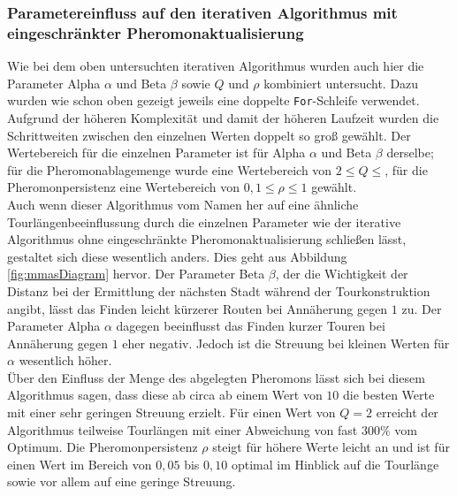 \documentclass[doktyp=barbeit, sprache=german]{TUBAFarbeiten}
\begin{document}
\subsubsection{Parametereinfluss auf den iterativen Algorithmus mit eingeschränkter Pheromonaktualisierung}
Wie bei dem oben untersuchten iterativen Algorithmus wurden auch hier die Parameter Alpha $\alpha$ und Beta $\beta$ sowie $Q$ und $\rho$ kombiniert untersucht. Dazu wurden wie schon oben gezeigt jeweils eine doppelte \texttt{For}-Schleife verwendet. Aufgrund der höheren Komplexität und damit der höheren Laufzeit wurden die Schrittweiten zwischen den einzelnen Werten doppelt so groß gewählt. Der Wertebereich für die einzelnen Parameter ist für Alpha $\alpha$ und Beta $\beta$ derselbe; für die Pheromonablagemenge wurde eine Wertebereich von $2 \leq Q \leq$, für die Pheromonpersistenz eine Wertebereich von $0,1 \leq \rho \leq 1$ gewählt.
\\Auch wenn dieser Algorithmus vom Namen her auf eine ähnliche Tourlängenbeeinflussung durch die einzelnen Parameter wie der iterative Algorithmus ohne eingeschränkte Pheromonaktualisierung schließen lässt, gestaltet sich diese wesentlich anders. Dies geht aus Abbildung \ref{fig:mmasDiagram} hervor. Der Parameter Beta $\beta$, der die Wichtigkeit der Distanz bei der Ermittlung der nächsten Stadt während der Tourkonstruktion angibt, 
lässt das Finden leicht kürzerer Routen bei Annäherung gegen $1$ zu. Der Parameter Alpha $\alpha$ dagegen beeinflusst das Finden kurzer Touren bei Annäherung gegen $1$ eher negativ. Jedoch ist die Streuung bei kleinen Werten für $\alpha$ wesentlich höher. \\Über den Einfluss der Menge des abgelegten Pheromons lässt sich bei diesem Algorithmus sagen, dass diese ab circa ab einem Wert von $10$ die besten Werte mit einer sehr geringen Streuung erzielt. Für einen Wert von $Q = 2$ erreicht der Algorithmus teilweise Tourlängen mit einer Abweichung von fast $300 \%$ vom Optimum. Die Pheromonpersistenz $\rho$ steigt für höhere Werte leicht an und ist für einen Wert im Bereich von $0,05$ bis $0,10$ optimal im Hinblick auf die Tourlänge sowie vor allem auf eine geringe Streuung.
\end{document}
